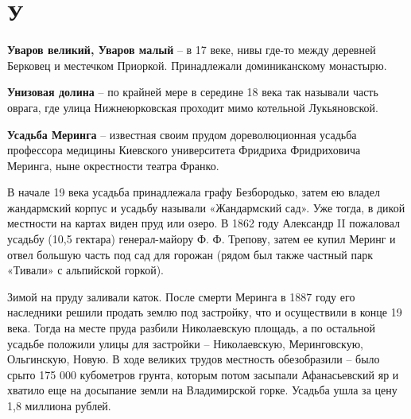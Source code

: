 \chapter*{У}

\textbf{Уваров великий, Уваров малый} – в 17 веке, нивы где-то между деревней Берковец и местечком Приоркой. Принадлежали доминиканскому монастырю.\\

\medskip







\textbf{Унизовая долина} – по крайней мере в середине 18 века так называли часть оврага, где улица Нижнеюрковская проходит мимо котельной Лукьяновской.\\

\medskip

\textbf{Усадьба Меринга} – известная своим прудом дореволюционная усадьба профессора медицины Киевского университета Фридриха Фридриховича Меринга, ныне окрестности театра Франко.

В начале 19 века усадьба принадлежала графу  Безбородько, затем ею владел жандармский корпус и усадьбу называли «Жандармский сад». Уже тогда, в дикой местности на картах виден пруд или озеро. В 1862 году Александр II пожаловал усадьбу (10,5 гектара) гене\-рал-майору Ф. Ф. Трепову, затем ее купил Меринг и отвел большую часть под сад для горожан (рядом был также частный парк «Тивали» с альпийской горкой). 

Зимой на пруду заливали каток. После смерти Меринга в 1887 году его наследники решили продать землю под застройку, что и осуществили в конце 19 века. Тогда на месте пруда разбили Николаевскую площадь, а по остальной усадьбе положили улицы для застройки – Николаевскую, Меринговскую, Ольгинскую, Новую. В ходе великих трудов местность обезобразили – было срыто 175 000 кубометров грунта, которым потом засыпали Афанасьевский яр и хватило еще на досыпание земли на Владимирской горке. Усадьба ушла за цену 1,8 миллиона рублей.

